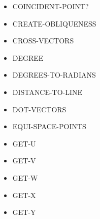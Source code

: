 \documentclass [11pt]{book}
\begin{document}
\begin{itemize}
\item {}COINCIDENT-POINT?





\item {}CREATE-OBLIQUENESS





\item {}CROSS-VECTORS





\item {}DEGREE





\item {}DEGREES-TO-RADIANS





\item {}DISTANCE-TO-LINE





\item {}DOT-VECTORS





\item {}EQUI-SPACE-POINTS





\item {}GET-U





\item {}GET-V





\item {}GET-W





\item {}GET-X





\item {}GET-Y






\end{itemize}
\end{document}
